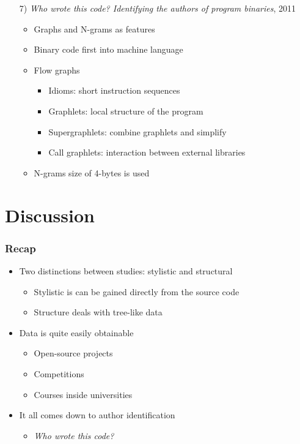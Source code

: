 \documentclass[t,12pt,pdftex]{beamer}
\begin{document}
\begin{frame}
	\vspace{0.5in}
	\begin{itemize}
		\item[7)] \textit{Who wrote
this code? Identifying the authors of program binaries}, 2011
		\begin{itemize}
			\item Graphs and N-grams as features
			\item Binary code first into machine language
			\item Flow graphs
			\begin{itemize}
				\item Idioms: short instruction sequences
				\item Graphlets: local structure of the program
				\item Supergraphlets: combine graphlets and simplify
				\item Call graphlets: interaction between external libraries
			\end{itemize}
			\item N-grams size of 4-bytes is used
		\end{itemize}
	\end{itemize}
\end{frame}


\section{Discussion}

\begin{frame}
	\frametitle{Recap}
	\begin{itemize}
		\item Two distinctions between studies: stylistic and structural
		\begin{itemize}
			\item Stylistic is can be gained directly from the source code
			\item Structure deals with tree-like data
		\end{itemize}
		\item Data is quite easily obtainable
		\begin{itemize}
			\item Open-source projects
			\item Competitions
			\item Courses inside universities
		\end{itemize}
		\item It all comes down to author identification
		\begin{itemize}
			\item \textit{Who wrote this code?}
		\end{itemize}
	\end{itemize}
\end{frame}
\end{document}
